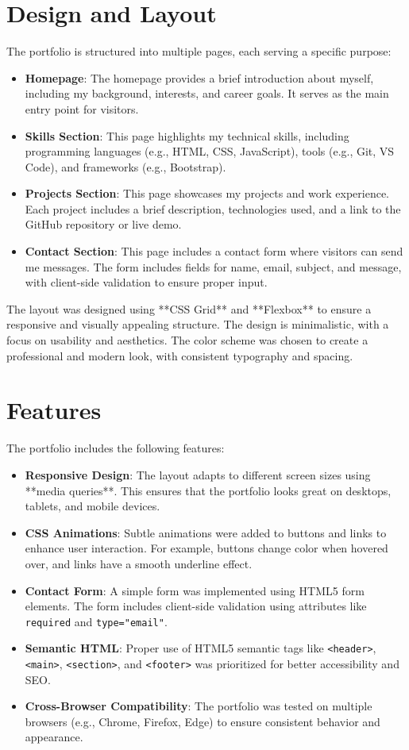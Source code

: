 \documentclass[12pt]{article}
\begin{document}
\section{\color{sectioncolor}Design and Layout}
\label{sec:design}
The portfolio is structured into multiple pages, each serving a specific purpose:
\begin{itemize}
    \item \textbf{Homepage}: The homepage provides a brief introduction about myself, including my background, interests, and career goals. It serves as the main entry point for visitors.
    \item \textbf{Skills Section}: This page highlights my technical skills, including programming languages (e.g., HTML, CSS, JavaScript), tools (e.g., Git, VS Code), and frameworks (e.g., Bootstrap).
    \item \textbf{Projects Section}: This page showcases my projects and work experience. Each project includes a brief description, technologies used, and a link to the GitHub repository or live demo.
    \item \textbf{Contact Section}: This page includes a contact form where visitors can send me messages. The form includes fields for name, email, subject, and message, with client-side validation to ensure proper input.
\end{itemize}

The layout was designed using **CSS Grid** and **Flexbox** to ensure a responsive and visually appealing structure. The design is minimalistic, with a focus on usability and aesthetics. The color scheme was chosen to create a professional and modern look, with consistent typography and spacing.

\section{\color{sectioncolor}Features}
\label{sec:features}
The portfolio includes the following features:
\begin{itemize}
    \item \textbf{Responsive Design}: The layout adapts to different screen sizes using **media queries**. This ensures that the portfolio looks great on desktops, tablets, and mobile devices.
    \item \textbf{CSS Animations}: Subtle animations were added to buttons and links to enhance user interaction. For example, buttons change color when hovered over, and links have a smooth underline effect.
    \item \textbf{Contact Form}: A simple form was implemented using HTML5 form elements. The form includes client-side validation using attributes like \texttt{required} and \texttt{type="email"}.
    \item \textbf{Semantic HTML}: Proper use of HTML5 semantic tags like \texttt{<header>}, \texttt{<main>}, \texttt{<section>}, and \texttt{<footer>} was prioritized for better accessibility and SEO.
    \item \textbf{Cross-Browser Compatibility}: The portfolio was tested on multiple browsers (e.g., Chrome, Firefox, Edge) to ensure consistent behavior and appearance.
\end{itemize}
\end{document}
